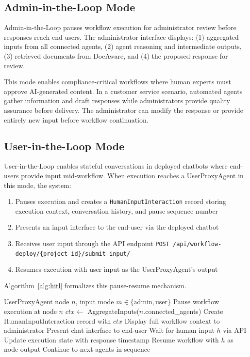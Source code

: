 \documentclass[11pt]{article}
\begin{document}
\subsection{Admin-in-the-Loop Mode}

Admin-in-the-Loop pauses workflow execution for administrator review before responses reach end-users. The administrator interface displays: (1) aggregated inputs from all connected agents, (2) agent reasoning and intermediate outputs, (3) retrieved documents from DocAware, and (4) the proposed response for review.

This mode enables compliance-critical workflows where human experts must approve AI-generated content. In a customer service scenario, automated agents gather information and draft responses while administrators provide quality assurance before delivery. The administrator can modify the response or provide entirely new input before workflow continuation.

\subsection{User-in-the-Loop Mode}

User-in-the-Loop enables stateful conversations in deployed chatbots where end-users provide input mid-workflow. When execution reaches a UserProxyAgent in this mode, the system:

\begin{enumerate}
    \item Pauses execution and creates a \texttt{HumanInputInteraction} record storing execution context, conversation history, and pause sequence number
    \item Presents an input interface to the end-user via the deployed chatbot
    \item Receives user input through the API endpoint \texttt{POST /api/workflow-deploy/\{project\_id\}/submit-input/}
    \item Resumes execution with user input as the UserProxyAgent's output
\end{enumerate}

Algorithm~\ref{alg:hitl} formalizes this pause-resume mechanism.

\begin{algorithm}[t]
\caption{Human-in-the-Loop Pause/Resume}
\label{alg:hitl}
\begin{algorithmic}[1]
\REQUIRE UserProxyAgent node $n$, input mode $m \in \{\text{admin}, \text{user}\}$
\STATE Pause workflow execution at node $n$
\STATE $ctx \leftarrow$ AggregateInputs($n$.connected\_agents)
\STATE Create HumanInputInteraction record with $ctx$
    \STATE Display full workflow context to administrator
\ELSE
    \STATE Present chat interface to end-user
\ENDIF
\STATE Wait for human input $h$ via API
\STATE Update execution state with response timestamp
\STATE Resume workflow with $h$ as node output
\RETURN Continue to next agents in sequence
\end{algorithmic}
\end{algorithm}
\end{document}
